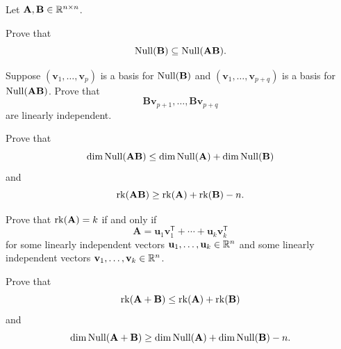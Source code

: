\documentclass[11pt,oneside]{article}
\begin{document}
\begin{problem}
Let $\mathbf A,\mathbf B\in\mathbb{R}^{n\times n}$.
\begin{problemsubparts}
\item Prove that
\[
\operatorname{Null}(\mathbf B)\subseteq\operatorname{Null}(\mathbf A\mathbf B).
\]
\item Suppose $(\mathbf v_1,\dots,\mathbf v_p)$ is a basis for $\operatorname{Null}(\mathbf B)$ and $(\mathbf v_1,\dots,\mathbf v_{p+q})$ is a basis for $\operatorname{Null}(\mathbf A\mathbf B)$. Prove that
\[
\mathbf B\mathbf v_{p+1},\dots,\mathbf B\mathbf v_{p+q}
\]
are linearly independent.
\item Prove that
\[
\dim\operatorname{Null}(\mathbf A\mathbf B)\le \dim\operatorname{Null}(\mathbf A)+\dim\operatorname{Null}(\mathbf B)
\]
and
\[
\operatorname{rk}(\mathbf A\mathbf B)\ge \operatorname{rk}(\mathbf A)+\operatorname{rk}(\mathbf B)-n.
\]
\item Prove that $\operatorname{rk}(\mathbf A)=k$ if and only if
\[
\mathbf A=\mathbf u_1\mathbf v_1^{\mathsf T}+\cdots+\mathbf u_k\mathbf v_k^{\mathsf T}
\]
for some linearly independent vectors $\mathbf u_1,\dots,\mathbf u_k\in\mathbb{R}^n$ and some linearly independent vectors $\mathbf v_1,\dots,\mathbf v_k\in\mathbb{R}^n$.
\item Prove that
\[
\operatorname{rk}(\mathbf A+\mathbf B)\le \operatorname{rk}(\mathbf A)+\operatorname{rk}(\mathbf B)
\]
and
\[
\dim\operatorname{Null}(\mathbf A+\mathbf B)\ge \dim\operatorname{Null}(\mathbf A)+\dim\operatorname{Null}(\mathbf B)-n.
\]
\end{problemsubparts}
\end{problem}
\end{document}
